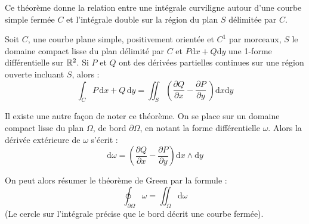 \ifVersionDuDocEstVincent\medskip\fi
\begin{theoreme}%

Ce théorème donne la relation entre une intégrale curviligne autour d'une courbe simple fermée $C$ et l'intégrale double sur la région du plan $S$ délimitée par $C$.

Soit $C$, une courbe plane simple, positivement orientée et $C^1$ par morceaux, $S$ le domaine compact lisse du plan délimité par $C$ et $P\mathrm d x + Q\mathrm d y$ une 1-forme différentielle sur $\mathbb R^2$. Si $P$ et $Q$ ont des dérivées partielles continues sur une région ouverte incluant $S$, alors :
\begin{equation}
\int_C P\,\mathrm dx + Q\,\mathrm dy = \iint_S \left( \frac{\partial Q}{\partial x} - \frac{\partial P}{\partial y}\ \right) \mathrm dx\mathrm dy
\end{equation}
\end{theoreme}

\ifVersionDuDocEstVincent\medskip\fi{}
Il existe une autre façon de noter ce théorème.
On se place sur un domaine compact lisse du plan $\Omega$, de bord $\partial\Omega$,
en notant la forme différentielle $\omega$.
Alors la dérivée extérieure de $\omega$ s'écrit :
\begin{equation}
\mathrm d\omega = \left( \frac{\partial Q}{\partial x} - \frac{\partial P}{\partial y} \right) \mathrm dx \wedge \mathrm dy
\end{equation}

On peut alors résumer le théorème de Green par la formule :
\begin{equation}
\oint_{\partial \Omega} \omega = \iint_{\Omega} \mathrm d\omega
\end{equation}
(Le cercle sur l'intégrale précise que le bord décrit une courbe fermée).

